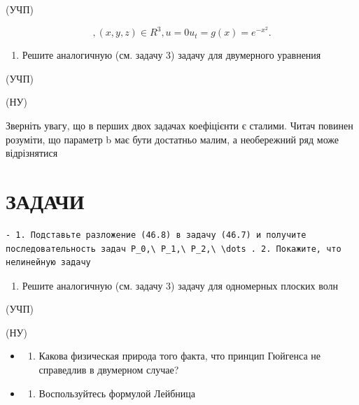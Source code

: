 \documentclass[
  ukrainian,
]{article}
\providecommand{\tightlist}{%
  \setlength{\itemsep}{0pt}\setlength{\parskip}{0pt}}
\begin{document}
(УЧП)

\[
,  (x,  y, z) \in R^3  ,  u = 0   u_t =
g(x) = e^{-x^2}.
\]

\begin{enumerate}
\def\labelenumi{\arabic{enumi}.}
\setcounter{enumi}{3}
\tightlist
\item
  Решите аналогичную (см. задачу 3) задачу для двумерного уравнения
\end{enumerate}

(УЧП)

(НУ)

Зверніть увагу, що в перших двох задачах коефіцієнти є сталими. Читач
повинен розуміти, що параметр b має бути достатньо малим, а необережний
ряд може відрізнятися

\section{ЗАДАЧИ}\label{ux437ux430ux434ux430ux447ux438-11}

\begin{verbatim}
- 1. Подставьте разложение (46.8) в задачу (46.7) и получите последовательность задач P_0,\ P_1,\ P_2,\ \dots . 2. Покажите, что нелинейную задачу
\end{verbatim}

\begin{enumerate}
\def\labelenumi{\arabic{enumi}.}
\setcounter{enumi}{4}
\tightlist
\item
  Решите аналогичную (см. задачу 3) задачу для одномерных плоских волн
\end{enumerate}

(УЧП)

(НУ)

\begin{itemize}
\tightlist
\item
  \begin{enumerate}
  \def\labelenumi{\arabic{enumi}.}
  \setcounter{enumi}{5}
  \tightlist
  \item
    Какова физическая природа того факта, что принцип Гюйгенса не
    справедлив в двумерном случае?
  \end{enumerate}
\item
  \begin{enumerate}
  \def\labelenumi{\arabic{enumi}.}
  \setcounter{enumi}{6}
  \tightlist
  \item
    Воспользуйтесь формулой Лейбница
  \end{enumerate}
\end{itemize}
\end{document}
